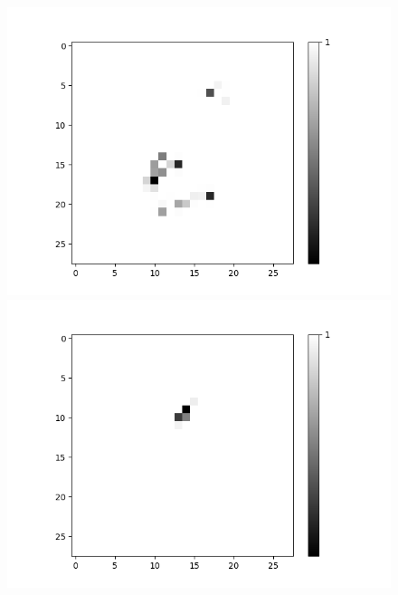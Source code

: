 \begin{figure}[H]
	\centering
	\begin{minipage}[b]{0.45\textwidth}
		\includegraphics[width=\textwidth]{LNN-AND-AND/Neuron-0.png}
		\caption{}
		\label{fig:lnn-and-and-neuron-0}
	\end{minipage}
	\begin{minipage}[b]{0.45\textwidth}
		\includegraphics[width=\textwidth]{LNN-AND-AND/Neuron-9.png}
		\caption{}
		\label{fig:lnn-and-and-neuron-9}
	\end{minipage}
	\begin{minipage}[b]{0.45\textwidth}

\end{minipage}
\end{figure}
